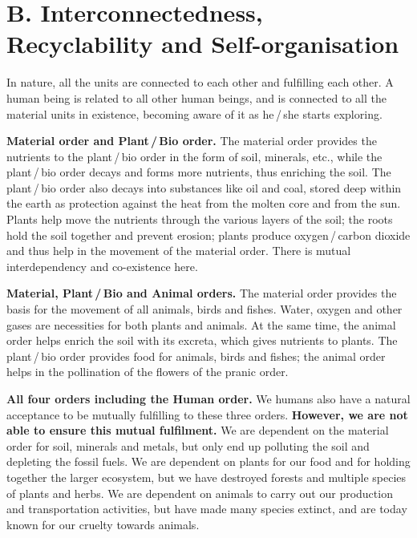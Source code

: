 \section{B. Interconnectedness, Recyclability and Self-organisation}


\ans In nature, all the units are connected to each other and fulfilling each
other. A human being is related to all other human beings, and is connected to
all the material units in existence, becoming aware of it as he\,/\,she starts
exploring.

\begin{abul}
\item \textbf{Material order and Plant\,/\,Bio order.} The material order
      provides the nutrients to the plant\,/\,bio order in the form of soil,
      minerals, etc., while the plant\,/\,bio order decays and forms more
      nutrients, thus enriching the soil. The plant\,/\,bio order also decays
      into substances like oil and coal, stored deep within the earth as
      protection against the heat from the molten core and from the sun.
      Plants help move the nutrients through the various layers of the soil;
      the roots hold the soil together and prevent erosion; plants produce
      oxygen\,/\,carbon dioxide and thus help in the movement of the material
      order. There is mutual interdependency and co-existence here.
\item \textbf{Material, Plant\,/\,Bio and Animal orders.} The material order
      provides the basis for the movement of all animals, birds and fishes.
      Water, oxygen and other gases are necessities for both plants and
      animals. At the same time, the animal order helps enrich the soil with
      its excreta, which gives nutrients to plants. The plant\,/\,bio order
      provides food for animals, birds and fishes; the animal order helps in
      the pollination of the flowers of the pranic order.
\item \textbf{All four orders including the Human order.} We humans also have
      a natural acceptance to be mutually fulfilling to these three orders.
      \textbf{However, we are not able to ensure this mutual fulfilment.} We
      are dependent on the material order for soil, minerals and metals, but
      only end up polluting the soil and depleting the fossil fuels. We are
      dependent on plants for our food and for holding together the larger
      ecosystem, but we have destroyed forests and multiple species of plants
      and herbs. We are dependent on animals to carry out our production and
      transportation activities, but have made many species extinct, and are
      today known for our cruelty towards animals.
\end{abul}

